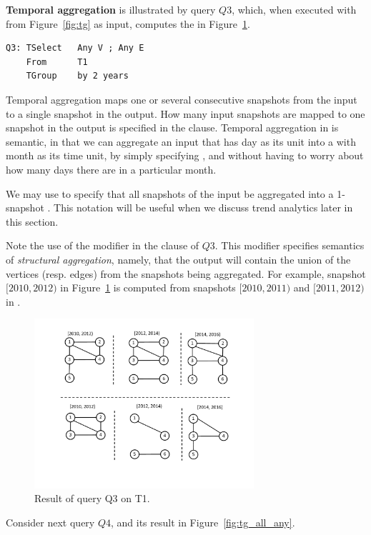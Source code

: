 {\bf Temporal aggregation} is illustrated by query $Q3$, which, when
executed with  from Figure~\ref{fig:tg} as input, computes
the \tg in Figure~\ref{fig:q3}.

\begin{verbatim}
Q3: TSelect   Any V ; Any E 
    From      T1
    TGroup    by 2 years
\end{verbatim}

Temporal aggregation maps one or several consecutive snapshots from
the input to a single snapshot in the output.  How many input
snapshots are mapped to one snapshot in the output is specified in the
 clause.  Temporal aggregation in \ql is semantic, in
that we can aggregate an input \tg that has day as its unit into a \tg
with month as its time unit, by simply specifying , and without having to worry about how many days there are in
a particular month.

We may use  to specify that all snapshots of the
input \tg be aggregated into a 1-snapshot \tg.  This notation will be
useful when we discuss trend analytics later in this section.

Note the use of the modifier  in the  clause
of $Q3$.  This modifier specifies semantics of {\em structural
  aggregation}, namely, that the output will contain the union of the
vertices (resp. edges) from the snapshots being aggregated.  For
example, snapshot $[2010, 2012)$ in Figure~\ref{fig:q3} is computed
  from snapshots $[2010, 2011)$ and $[2011, 2012)$ in .

\begin{figure}
\includegraphics[width=3.2in]{figs/TGroupAny.pdf}
\caption{Result of query Q3 on T1.}
\label{fig:q3}
\end{figure}

Consider next query $Q4$, and its result in
Figure~\ref{fig:tg_all_any}.

